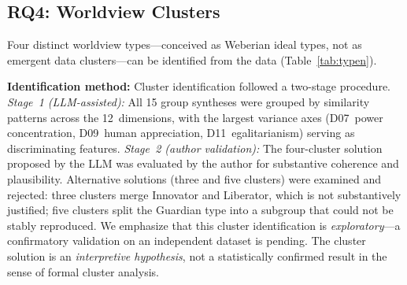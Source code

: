 \documentclass[12pt,a4paper]{article}
\begin{document}
\subsection{RQ4: Worldview Clusters}
\label{sec:ergebnisse:f4}

Four distinct worldview types---conceived as Weberian ideal types, not as emergent data clusters---can be identified from the data (Table~\ref{tab:typen}).

\textbf{Identification method:} Cluster identification followed a two-stage procedure. \emph{Stage~1 (LLM-assisted):} All 15 group syntheses were grouped by similarity patterns across the 12~dimensions, with the largest variance axes (D07~power concentration, D09~human appreciation, D11~egalitarianism) serving as discriminating features. \emph{Stage~2 (author validation):} The four-cluster solution proposed by the LLM was evaluated by the author for substantive coherence and plausibility. Alternative solutions (three and five clusters) were examined and rejected: three clusters merge Innovator and Liberator, which is not substantively justified; five clusters split the Guardian type into a subgroup that could not be stably reproduced. We emphasize that this cluster identification is \emph{exploratory}---a confirmatory validation on an independent dataset is pending. The cluster solution is an \emph{interpretive hypothesis}, not a statistically confirmed result in the sense of formal cluster analysis.

\begin{table}[htbp]
  \centering
  \caption{The four worldview types of the AI elite.}
  \label{tab:typen}
  \small
\end{table}
\end{document}
